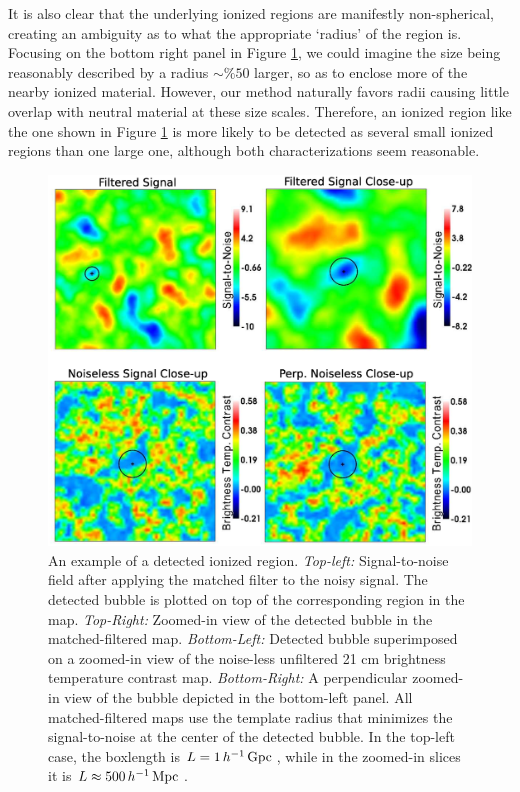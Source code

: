 It is also clear that the underlying ionized regions are manifestly non-spherical,
creating an ambiguity as to what the appropriate `radius' of the
region is. Focusing on the bottom right panel in
Figure \ref{fig:ShowAverageBubble}, we could imagine the size being
reasonably described by a radius $\sim \%50$ larger, so as to enclose more
of the nearby ionized material. However, our method naturally favors
radii causing little overlap with neutral material at these size
scales. Therefore, an ionized region like the one shown in
Figure \ref{fig:ShowAverageBubble} is more likely to be detected as several
small ionized regions than one large one, although both
characterizations seem reasonable. 
\begin{figure}
  \centering
  \includegraphics[width=16.8cm]{f7.eps}  
  \caption{An example of a detected ionized region. \textit{Top-left:}
    Signal-to-noise field after applying the matched filter to
    the noisy signal. The detected bubble is plotted on top of the
    corresponding region in the map. \textit{Top-Right:} Zoomed-in
    view of the detected bubble in the matched-filtered
    map. \textit{Bottom-Left:} Detected bubble superimposed on a
    zoomed-in view of the noise-less unfiltered 21 cm brightness
    temperature contrast map. \textit{Bottom-Right:} A perpendicular
    zoomed-in view of the bubble depicted in the bottom-left
    panel. All matched-filtered maps use the template radius that
    minimizes the signal-to-noise at the center of the detected
    bubble. In the top-left case, the boxlength is $L = 1\,h^{-1}\,{\rm Gpc}\,$,
    while in the zoomed-in slices it is $L \approx 500\,h^{-1}\,{\rm Mpc}\,$.}
  \label{fig:ShowAverageBubble}
\end{figure}


